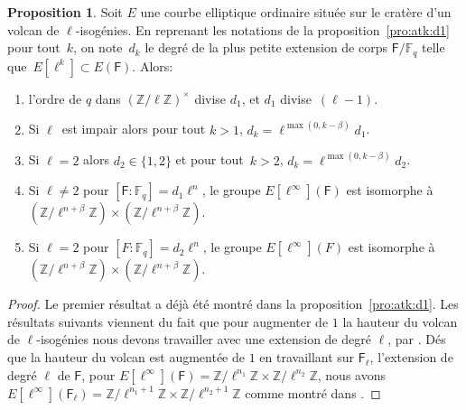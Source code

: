 \documentclass[10pt,a4paper]{book}
\theoremstyle{plain}
\theoremstyle{definition}
\theoremstyle{definition}
\theoremstyle{definition}
\theoremstyle{definition}
\newtheorem{prop}[thm]{Proposition}
\theoremstyle{definition}
\theoremstyle{remark}
\theoremstyle{remark}
\theoremstyle{definition}
\begin{document}
\begin{prop}\label{pro:clas:fro:atk}
Soit $E$ une courbe elliptique ordinaire située sur le cratère d'un 
volcan de $\ell$-isogénies. En reprenant les notations de la 
proposition~\ref{pro:atk:d1} pour tout~$k$, on note~$d_k$ le degré de la plus 
petite extension de corps $\mathsf{F}/\mathbb{F}_q$ telle que~$E[\ell^k]\subset
E(\mathsf{F})$. 
Alors:
\begin{enumerate}
\item l'ordre de $q$ dans $(\mathbb{Z}/ \ell \mathbb{Z})^\times$ divise $d_1$,
et $d_1$ divise~$(\ell-1)$.
\item Si $\ell$~est impair alors pour tout $k > 1$,
$ d_k = \ell^{\max (0, k - \beta)}d_1$.
\item Si $\ell=2$ alors $d_2 \in \{1,2\}$ et pour tout~$k > 2$,
$d_k = \ell^{\max (0, k - \beta)}d_2$.
\item Si $\ell \neq 2$ pour $[\mathsf{F}:\mathbb{F}_q]=d_1\ell^n$, le groupe $E[\ell^{\infty}](\mathsf{F})$ est isomorphe à~$(\mathbb{Z}/\ell^{n+\beta} \mathbb{Z}) \times (\mathbb{Z}/\ell^{n+\beta} \mathbb{Z})$.
\item Si $\ell = 2$ pour $[F:\mathbb{F}_q]=d_2\ell^n$, le groupe $E[\ell^{\infty}](F)$ est isomorphe à~$(\mathbb{Z}/\ell^{n+\beta} \mathbb{Z}) \times (\mathbb{Z}/\ell^{n+\beta} \mathbb{Z})$.
\end{enumerate}
\end{prop}

\begin{proof}
Le premier résultat a déjà été montré dans la proposition~\ref{pro:atk:d1}.
Les résultats suivants viennent du fait que pour augmenter de $1$ la hauteur du
volcan de $\ell$-isogénies nous devons travailler avec une extension 
de degré $\ell$, par \cite[Lemme 6.5.2]{Fouquet01}. Dés que la hauteur du 
volcan est augmentée de $1$ en travaillant sur $\mathsf{F}_{\ell}$, l'extension de
degré $\ell$ de $\mathsf{F}$, pour $E[\ell^{\infty}](\mathsf{F})= \mathbb{Z}/
\ell^{n_1} \mathbb{Z} \times \mathbb{Z}/\ell^{n_2} \mathbb{Z}$, nous avons 
$E[\ell^{\infty}](\mathsf{F}_{\ell})= \mathbb{Z}/\ell^{n_1+1} \mathbb{Z} \times
\mathbb{Z}/\ell^{n_2+1} \mathbb{Z}$ comme montré dans \cite[§5.3.1]{Ionica2010}.
\end{proof}
\end{document}
